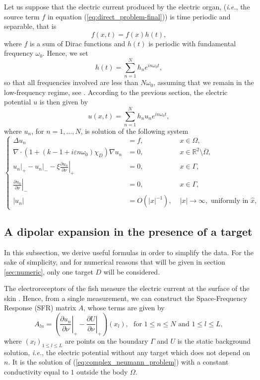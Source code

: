 \documentclass[final]{siamltex}
\numberwithin{equation}{section}
\numberwithin{figure}{section}
\numberwithin{table}{section}
\begin{document}
Let us suppose that the electric current produced by the electric
organ, (\emph{i.e.}, the source term $f$ in equation
(\ref{eq:direct_problem-final})) is time periodic and separable,
that is
\[
f(x,t)={f}(x)h(t),
\]
 where ${f}$ is a sum of Dirac functions and $h(t)$
is periodic with fundamental frequency $\omega_{0}$. Hence, we set
\begin{equation}
h(t)=\sum_{n=1}^N h_{n}e^{in\omega_{0}t},\label{eq:formule-h}
\end{equation}
so that all frequencies involved are less than $N \omega_0$,
assuming that we remain in the low-frequency regime, see
\cite{moller1995}. According to the previous section, the electric
potential $u$ is then given by
\begin{equation} \label{sumu}
u(x,t)=\sum_{n=1}^N h_{n}u_{n}e^{in\omega_{0}t},
\end{equation}
 where $u_{n}$, for $n=1,\ldots, N$,  is solution of the following system
\begin{equation}
\left\{ \begin{alignedat}{2} \Delta u_n & = {f}, & \,
\, x\in \Omega,\\
\nabla\cdot (1+ (k -1 +i\varepsilon n \omega_0) \chi_D) \nabla u_n
& = 0, & \,
\, x\in\mathbb{R}^{2}\setminus\overline{\Omega},\\
{} u_{n} \big|_+ - u_{n}  \big|_- - \xi\left.\frac{\partial u_{n}}{\partial\nu}\right|_{+} & =0, & \,\, x\in\Gamma,\\
\left.\frac{\partial u_{n}}{\partial\nu}\right|_{-} & =0, & \,\, x\in\Gamma,\\
\left|u_{n}\right| & = {O}(\left|x\right|^{-1}), &
\,\,\left|x\right|\rightarrow\infty,\text{ uniformly in }\hat{x},
\end{alignedat}
\right.\label{eq:complex_neumann_problem}
\end{equation}



\subsection{A dipolar expansion in the presence of a target}

\label{sub:dipolar-expansion}

In this subsection, we derive useful formulas in order to simplify
the data. For the sake of simplicity, and for numerical reasons
that will be given in section \ref{sec:numeric}, only one target
$D$ will be considered.

The electroreceptors of the fish measure the electric current at
the surface of the skin \cite{moller1995}. Hence, from a single
measurement, we can construct the Space-Frequency Response (SFR)
matrix $A$, whose terms are given by
\[
A_{ln}=\left(\left.\frac{\partial
u_{n}}{\partial\nu}\right|_{+}-\left.\frac{\partial
U}{\partial\nu}\right|_{+}\right)(x_{l}),\,\,\textrm{ for } 1\leq
n\leq N\textrm{ and }1\leq l\leq L,
\]
 where $\left(x_{l}\right)_{1\leq l\leq L}$ are points on the boundary
$\Gamma$ and $U$ is the static background solution, \emph{i.e.},
the electric potential without any target which does not depend on
$n$. It is the solution of (\ref{eq:complex_neumann_problem}) with
a constant conductivity equal to $1$ outside the body $\Omega$.
\end{document}
